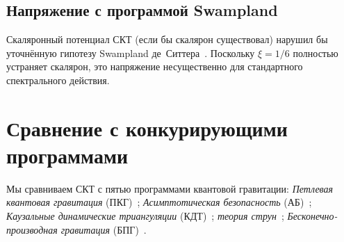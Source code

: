 \documentclass[12pt,a4paper]{article}
\theoremstyle{plain}
\theoremstyle{definition}
\theoremstyle{remark}
\begin{document}
\subsection{Напряжение с программой Swampland}
\label{sec:swampland}

Скаляронный потенциал СКТ (если бы скалярон существовал) нарушил бы
уточнённую гипотезу Swampland де~Ситтера~\cite{Obied:2018}.
Поскольку $\xi = 1/6$ полностью устраняет скалярон, это напряжение
несущественно для стандартного спектрального действия.

\section{Сравнение с конкурирующими программами}
\label{sec:comparison}

Мы сравниваем СКТ с пятью программами квантовой гравитации:
\emph{Петлевая квантовая гравитация}
(ПКГ)~\cite{Rovelli:2004,Thiemann:2007};
\emph{Асимптотическая безопасность}
(АБ)~\cite{ReuterSaueressig:2012};
\emph{Каузальные динамические триангуляции}
(КДТ)~\cite{AJL:2012};
\emph{теория струн}~\cite{Polchinski:1998};
\emph{Бесконечно-производная гравитация}
(БПГ)~\cite{BMS:2006,Modesto:2012}.
\end{document}
